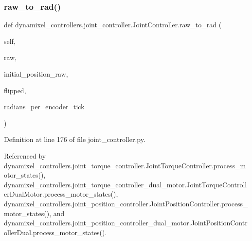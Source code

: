 \subsubsection{\texorpdfstring{raw\+\_\+to\+\_\+rad()}{raw\_to\_rad()}}
{\footnotesize\ttfamily def dynamixel\+\_\+controllers.\+joint\+\_\+controller.\+Joint\+Controller.\+raw\+\_\+to\+\_\+rad (\begin{DoxyParamCaption}\item[{}]{self,  }\item[{}]{raw,  }\item[{}]{initial\+\_\+position\+\_\+raw,  }\item[{}]{flipped,  }\item[{}]{radians\+\_\+per\+\_\+encoder\+\_\+tick }\end{DoxyParamCaption})}



Definition at line 176 of file joint\+\_\+controller.\+py.



Referenced by dynamixel\+\_\+controllers.\+joint\+\_\+torque\+\_\+controller.\+Joint\+Torque\+Controller.\+process\+\_\+motor\+\_\+states(), dynamixel\+\_\+controllers.\+joint\+\_\+torque\+\_\+controller\+\_\+dual\+\_\+motor.\+Joint\+Torque\+Controller\+Dual\+Motor.\+process\+\_\+motor\+\_\+states(), dynamixel\+\_\+controllers.\+joint\+\_\+position\+\_\+controller.\+Joint\+Position\+Controller.\+process\+\_\+motor\+\_\+states(), and dynamixel\+\_\+controllers.\+joint\+\_\+position\+\_\+controller\+\_\+dual\+\_\+motor.\+Joint\+Position\+Controller\+Dual.\+process\+\_\+motor\+\_\+states().


